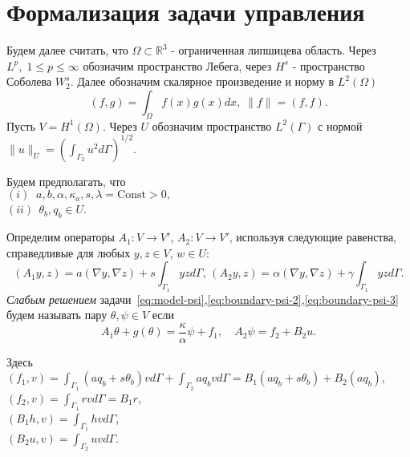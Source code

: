 \section{Формализация задачи управления}\label{sec:formalization}
Будем далее считать, что $\Omega \subset \mathbb{R}^3$ - ограниченная липшицева область.
Через $L^p, \; 1 \leq p \leq \infty$ обозначим пространство Лебега, через $H^s$ - пространство Соболева $W^s_2$.
Далее обозначим скалярное произведение и норму в $L^2(\Omega)$
\[
    (f, g) = \int_\Omega f(x)g(x)dx, \; \| f \| = (f, f).
\]
Пусть $V = H^1(\Omega)$.
Через $U$ обозначим пространство $L^2(\Gamma)$ с нормой
$\|u\|_{U} = \left(\int_{\Gamma_2} u^2 d\Gamma\right)^{1/2}.$

Будем предполагать, что \\
$(i) \;\; a, b,\alpha,\kappa_a, s, \lambda = \textrm{Const} > 0,$ \\
$(ii) \;\, \theta_b, q_b \in U$.

Определим операторы $A_1\colon V \to V'$, $A_2\colon V \to V'$, используя
следующие равенства, справедливые для любых $y,z \in V$, $w\in U$:
\[
    (A_1 y,z) = a(\nabla y, \nabla z) + s\int_{\Gamma_1} yz d\Gamma, \,
    (A_2 y, z) = \alpha (\nabla y, \nabla z) + \gamma \int_{\Gamma_1} yz d\Gamma.
\]
\textit{Слабым решением} задачи~\eqref{eq:model-psi},\eqref{eq:boundary-psi-2},\eqref{eq:boundary-psi-3}
будем называть пару $\theta, \psi \in V$ если
\begin{equation}
    \label{eq:weak}
    A_1\theta  + g(\theta) = \frac{\kappa}{\alpha} \psi + f_1, \quad
    A_2\psi = f_2 + B_2 u.
\end{equation}

Здесь
$(f_1, v) = \int_{\Gamma_1} (a q_b + s \theta_b) v d\Gamma + \int_{\Gamma_2} a q_b v d\Gamma
= B_1(a q_b + s \theta_b) + B_2(a q_b)$,\\
$(f_2, v) = \int_{\Gamma_1} r v d\Gamma = B_1 r$,\\
$(B_1 h,v) = \int_{\Gamma_1} h v d\Gamma$,\\
$(B_2 u, v) = \int_{\Gamma_2} u v d\Gamma$.

